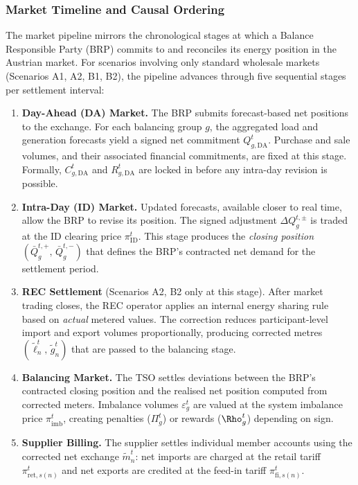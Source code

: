 \documentclass[12pt,a4paper]{article}
\begin{document}
\subsubsection{Market Timeline and Causal Ordering}

The market pipeline mirrors the chronological stages at which a Balance
Responsible Party (BRP) commits to and reconciles its energy position in the
Austrian market.  For scenarios involving only standard wholesale markets
(Scenarios A1, A2, B1, B2), the pipeline advances through five sequential
stages per settlement interval:

\begin{enumerate}[leftmargin=2.5em, label=\textbf{Stage~\arabic*.}]
  \item \textbf{Day-Ahead (DA) Market.}  The BRP submits forecast-based net
        positions to the exchange.  For each balancing group $g$, the
        aggregated load and generation forecasts yield a signed net commitment
        $Q_{g,\mathrm{DA}}^{t}$.  Purchase and sale volumes, and their
        associated financial commitments, are fixed at this stage.
        Formally, $C_{g,\mathrm{DA}}^{t}$ and $R_{g,\mathrm{DA}}^{t}$ are
        locked in before any intra-day revision is possible.

  \item \textbf{Intra-Day (ID) Market.}  Updated forecasts, available closer
        to real time, allow the BRP to revise its position.  The signed
        adjustment $\Delta Q_{g}^{t,\pm}$ is traded at the ID clearing price
        $\pi_{\mathrm{ID}}^{t}$.  This stage produces the \emph{closing
        position} $(\bar{Q}_{g}^{t,+},\, \bar{Q}_{g}^{t,-})$ that defines
        the BRP's contracted net demand for the settlement period.

  \item \textbf{REC Settlement} (Scenarios A2, B2 only at this stage).  After
        market trading closes, the REC operator applies an internal energy
        sharing rule based on \emph{actual} metered values.  The correction
        reduces participant-level import and export volumes proportionally,
        producing corrected metres $(\tilde{\ell}_{n}^{t},\,\tilde{g}_{n}^{t})$
        that are passed to the balancing stage.

  \item \textbf{Balancing Market.}  The TSO settles deviations between the
        BRP's contracted closing position and the realised net position
        computed from corrected meters.  Imbalance volumes
        $\varepsilon_{g}^{t}$ are valued at the system imbalance price
        $\pi_{\mathrm{imb}}^{t}$, creating penalties ($\Pi_{g}^{t}$) or
        rewards ($\Rho_{g}^{t}$) depending on sign.

  \item \textbf{Supplier Billing.}  The supplier settles individual member
        accounts using the corrected net exchange $\tilde{m}_{n}^{t}$:
        net imports are charged at the retail tariff
        $\pi_{\mathrm{ret},s(n)}^{t}$ and net exports are credited at the
        feed-in tariff $\pi_{\mathrm{fi},s(n)}^{t}$.
\end{enumerate}
\end{document}
